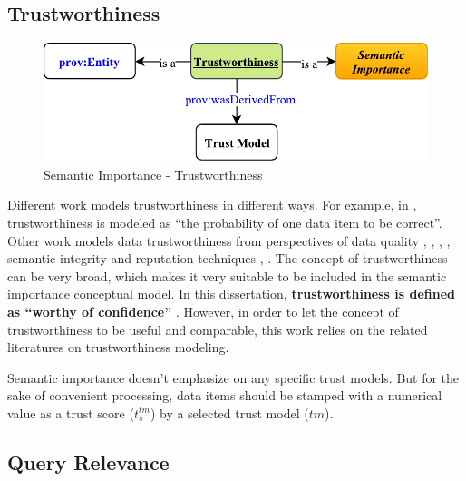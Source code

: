 \subsection{Trustworthiness}

\begin{figure}[!htbp]
	\centering
    \includegraphics[width=5in]{img/3-sit.pdf}
    \caption{Semantic Importance - Trustworthiness}
    \label{fig:3-sit}
\end{figure}

Different work models trustworthiness in different ways.
For example, in \cite{bertino2009challenge}, trustworthiness is modeled as ``the probability of one data item to be correct''. 
Other work models data trustworthiness from perspectives of data quality \cite{juran1999quality}, \cite{kahn2002information}, \cite{prince2004semiotic}, \cite{wand1996anchoring}, semantic integrity \cite{date2004database} and reputation techniques \cite{kamvar2003eigentrust}, \cite{levien2009attack}. 
The concept of trustworthiness can be very broad, which makes it very suitable to be included in the semantic importance conceptual model. 
In this dissertation, \textbf{trustworthiness is defined as ``worthy of confidence''} \cite{trustdef2018}.
However, in order to let the concept of trustworthiness to be useful and comparable, this work relies on the related literatures on trustworthiness modeling. 

Semantic importance doesn't emphasize on any specific trust models.
But for the sake of convenient processing, data items should be stamped with a numerical value as a trust score ($t^{tm}_{s}$) by a selected trust model ($tm$). 
%
\subsection{Query Relevance}

